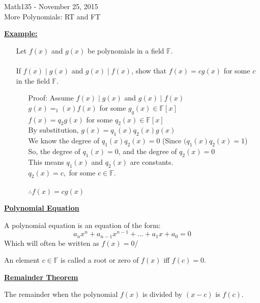 \documentclass{letter}
\begin{document}
	\begin{center}
		\LARGE Math135 - November 25, 2015\\
		\large More Polynomials: RT and FT
	\end{center}
	\vspace{0.25 in}
	\underline{\textbf{Example:}}
	
	\begin{itemize}
		\item[\;\;] Let $f(x)$ and $g(x)$ be polynomials in a field $\mathbb{F}$.\\\\
		If $f(x) \;\vert\; g(x)$ and $g(x)\;\vert\; f(x)$, show that $f(x) = c g(x)$ for some $c$ in the field $\mathbb{F}$.\\
		\begin{itemize}
			\item[Proof: ] Assume $f(x) \mid g(x)$ and $g(x) \mid f(x)$\\
			$g(x) = _1(x)f(x)$ for some $g_q(x) \in \mathbb{F}\left[x\right]$\\
			$f(x) = q_2g(x)$ for some $q_2(x) \in \mathbb{F}\left[x\right]$\\
			
			By substitution, $g(x) = q_1(x)q_2(x)g(x)$\\
			We know the degree of $q_1(x)q_2(x) = 0$ (Since $(q_1(x)q_2(x) = 1$)\\
			So, the degree of $q_1(x) = 0$, and the degree of $q_2(x) = 0$\\
			This means $q_1(x)$ and $q_2(x)$ are constants.\\
			$q_2(x) = c,$ for some $c \in \mathbb{F}$.\\\\
			$\therefore f(x) = c g(x)$
		\end{itemize}
	\end{itemize}
	\underline{\textbf{Polynomial Equation}}
	
	A polynomial equation is an equation of the form:
	\[ a_nx^n + a_{n-1}x^{n-1}+ \dots + a_1x + a_0 = 0 \]
	Which will often be written as $f(x) = 0$/
	
	An element $c \in \mathbb{F}$ is called a root or zero of $f(x)$ iff $f(c) = 0$.
	
	\underline{\textbf{Remainder Theorem}}
	
	The remainder when the polynomial $f(x)$ is divided by $(x-c)$ is $f(c)$.
	
\end{document}
